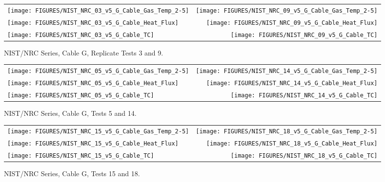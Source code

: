 \begin{figure}[h]
\begin{tabular*}{\textwidth}{l@{\extracolsep{\fill}}r}
\texttt{[image: FIGURES/NIST\_NRC\_03\_v5\_G\_Cable\_Gas\_Temp\_2-5]} &
\texttt{[image: FIGURES/NIST\_NRC\_09\_v5\_G\_Cable\_Gas\_Temp\_2-5]} \\
\texttt{[image: FIGURES/NIST\_NRC\_03\_v5\_G\_Cable\_Heat\_Flux]} &
\texttt{[image: FIGURES/NIST\_NRC\_09\_v5\_G\_Cable\_Heat\_Flux]} \\
\texttt{[image: FIGURES/NIST\_NRC\_03\_v5\_G\_Cable\_TC]} &
\texttt{[image: FIGURES/NIST\_NRC\_09\_v5\_G\_Cable\_TC]}
\end{tabular*}
\caption{NIST/NRC Series, Cable G, Replicate Tests 3 and 9.}
\label{NIST_NRC_G_3_and_9}
\end{figure}

\begin{figure}[h]
\begin{tabular*}{\textwidth}{l@{\extracolsep{\fill}}r}
\texttt{[image: FIGURES/NIST\_NRC\_05\_v5\_G\_Cable\_Gas\_Temp\_2-5]} &
\texttt{[image: FIGURES/NIST\_NRC\_14\_v5\_G\_Cable\_Gas\_Temp\_2-5]} \\
\texttt{[image: FIGURES/NIST\_NRC\_05\_v5\_G\_Cable\_Heat\_Flux]} &
\texttt{[image: FIGURES/NIST\_NRC\_14\_v5\_G\_Cable\_Heat\_Flux]} \\
\texttt{[image: FIGURES/NIST\_NRC\_05\_v5\_G\_Cable\_TC]} &
\texttt{[image: FIGURES/NIST\_NRC\_14\_v5\_G\_Cable\_TC]}
\end{tabular*}
\caption{NIST/NRC Series, Cable G, Tests 5 and 14.}
\label{NIST_NRC_G_5_and_14}
\end{figure}

\begin{figure}[h]
\begin{tabular*}{\textwidth}{l@{\extracolsep{\fill}}r}
\texttt{[image: FIGURES/NIST\_NRC\_15\_v5\_G\_Cable\_Gas\_Temp\_2-5]} &
\texttt{[image: FIGURES/NIST\_NRC\_18\_v5\_G\_Cable\_Gas\_Temp\_2-5]} \\
\texttt{[image: FIGURES/NIST\_NRC\_15\_v5\_G\_Cable\_Heat\_Flux]} &
\texttt{[image: FIGURES/NIST\_NRC\_18\_v5\_G\_Cable\_Heat\_Flux]} \\
\texttt{[image: FIGURES/NIST\_NRC\_15\_v5\_G\_Cable\_TC]} &
\texttt{[image: FIGURES/NIST\_NRC\_18\_v5\_G\_Cable\_TC]}
\end{tabular*}
\caption{NIST/NRC Series, Cable G, Tests 15 and 18.}
\label{NIST_NRC_G_15_and_18}
\end{figure}


\clearpage


